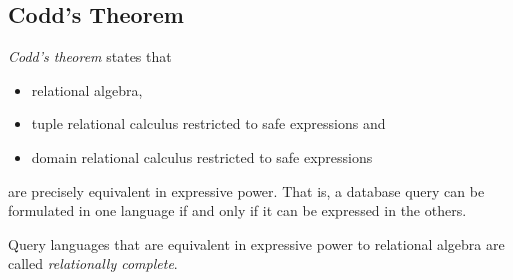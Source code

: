 \subsection{Codd's Theorem}

\emph{Codd's theorem} states that
\begin{itemize}
\item relational algebra,
\item tuple relational calculus restricted to safe expressions and
\item domain relational calculus restricted to safe expressions
\end{itemize}
are precisely equivalent in expressive power. That is, a database query can be formulated in one language if and only if it can be expressed in the others.

Query languages that are equivalent in expressive power to relational algebra are called \emph{relationally complete}.


